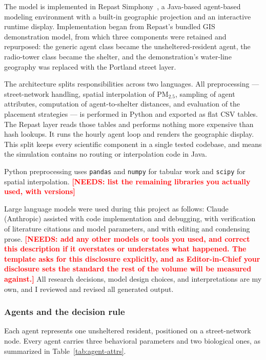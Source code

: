 \documentclass[graybox]{svmult}
\newcommand{\NEEDS}[1]{\textcolor{red}{\textbf{[NEEDS: #1]}}}
\begin{document}
The model is implemented in Repast Simphony~\cite{north2013}, a Java-based
agent-based modeling environment with a built-in geographic projection and an
interactive runtime display. Implementation began from
Repast's bundled GIS demonstration model, from which three components were
retained and repurposed: the generic agent class became the unsheltered-resident
agent, the radio-tower class became the shelter, and the demonstration's
water-line geography was replaced with the Portland street layer.

The architecture splits responsibilities across two languages. All preprocessing
--- street-network handling, spatial interpolation of PM$_{2.5}$, sampling of
agent attributes, computation of agent-to-shelter distances, and evaluation of
the placement strategies --- is performed in Python and exported as flat CSV
tables. The Repast layer reads those tables and performs nothing more expensive
than hash lookups. It runs the hourly agent loop and renders the geographic
display. This split keeps every scientific component in a single tested codebase,
and means the simulation contains no routing or interpolation code in Java.

Python preprocessing uses \texttt{pandas} and \texttt{numpy} for tabular work and
\texttt{scipy} for spatial interpolation.
\NEEDS{list the remaining libraries you actually used, with versions}

Large language models were used during this project as follows: Claude
(Anthropic) assisted with code implementation and debugging, with verification of
literature citations and model parameters, and with editing and condensing prose.
\NEEDS{add any other models or tools you used, and correct this description if it
overstates or understates what happened. The template asks for this disclosure
explicitly, and as Editor-in-Chief your disclosure sets the standard the rest of
the volume will be measured against.} All research decisions, model design
choices, and interpretations are my own, and I reviewed and revised all generated
output.

\subsubsection{Agents and the decision rule}

Each agent represents one unsheltered resident, positioned on a street-network
node. Every agent carries three behavioral parameters and two biological ones, as
summarized in Table~\ref{tab:agent-attrs}.
\end{document}
